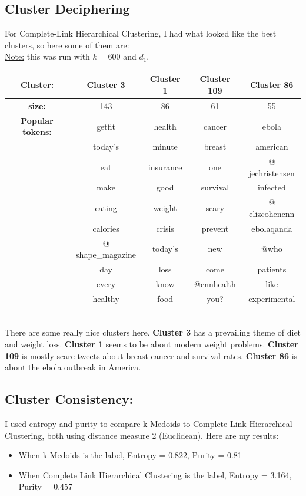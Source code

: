 \documentclass[fleqn]{article}
\begin{document}
\subsection{Cluster Deciphering}
For Complete-Link Hierarchical Clustering, I had what looked like the best clusters, so here some of them are:\\
\underline{Note:} this was run with $k=600$ and $d_1$.\\
\newline
\begin{tabular}{|c|c|c|c|c|}
	\hline
	\textbf{Cluster:} &\textbf{Cluster 3}& \textbf{Cluster 1}&\textbf{Cluster 109}&\textbf{Cluster 86}\\
	\hline
	\textbf{size:}& 143 & 86 & 61&55\\
	\hline
	\textbf{Popular tokens:}& getfit& health&cancer&ebola\\
	&today's&minute&breast&american\\
	&eat&insurance&one&$@$jechristensen\\
	&make&good&survival&infected\\
	&eating&weight&scary&$@$elizcohencnn\\
	&calories&crisis&prevent &ebolaqanda\\
	&$@$shape\_magazine&today's&new& $@$who\\
	&day&loss&come &patients\\
	&every&know&@cnnhealth &like \\
	&healthy&food&you?&experimental\\
	\hline
\end{tabular}\\
\newline
There are some really nice clusters here. \textbf{Cluster 3} has a prevailing theme of diet and weight loss.  \textbf{Cluster 1} seems to be about modern weight problems. \textbf{Cluster 109} is mostly scare-tweets about breast cancer and survival rates.  \textbf{Cluster 86} is about the ebola outbreak in America.
\subsection{Cluster Consistency:}
I used entropy and purity to compare k-Medoids to Complete Link Hierarchical Clustering, both using distance measure 2 (Euclidean).  Here are my results:
\begin{itemize}
	\item When k-Medoids is the label, Entropy = 0.822, Purity = 0.81
	\item When Complete Link Hierarchical Clustering is the label, Entropy = 3.164, Purity = 0.457
\end{itemize}
\end{document}
